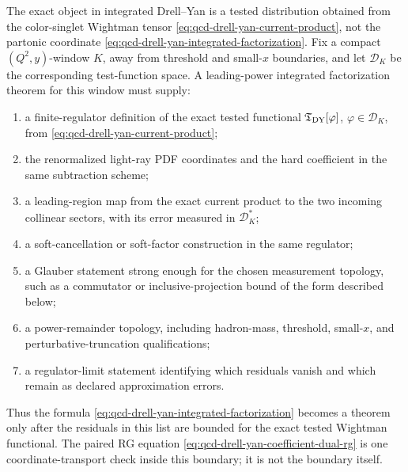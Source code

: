 \begin{remark}
\label{ca:qcd-drell-yan-integrated-theorem-boundary}
The exact object in integrated Drell--Yan is a tested distribution obtained
from the color-singlet Wightman tensor
\eqref{eq:qcd-drell-yan-current-product}, not the partonic coordinate
\eqref{eq:qcd-drell-yan-integrated-factorization}.  Fix a compact
\((Q^2,y)\)-window \(K\), away from threshold and small-\(x\) boundaries, and
let \(\mathcal D_K\) be the corresponding test-function space.  A
leading-power integrated factorization theorem for this window must supply:
\begin{enumerate}
  \item a finite-regulator definition of the exact tested functional
  \(\mathfrak T_{\rm DY}[\varphi]\), \(\varphi\in\mathcal D_K\), from
  \eqref{eq:qcd-drell-yan-current-product};
  \item the renormalized light-ray PDF coordinates and the hard coefficient in
  the same subtraction scheme;
  \item a leading-region map from the exact current product to the two
  incoming collinear sectors, with its error measured in
  \(\mathcal D_K^\ast\);
  \item a soft-cancellation or soft-factor construction in the same regulator;
  \item a Glauber statement strong enough for the chosen measurement topology,
  such as a commutator or inclusive-projection bound of the form described
  below;
  \item a power-remainder topology, including hadron-mass, threshold,
  small-\(x\), and perturbative-truncation qualifications;
  \item a regulator-limit statement identifying which residuals vanish and
  which remain as declared approximation errors.
\end{enumerate}
Thus the formula
\eqref{eq:qcd-drell-yan-integrated-factorization} becomes a theorem only after
the residuals in this list are bounded for the exact tested Wightman functional.
The paired RG equation \eqref{eq:qcd-drell-yan-coefficient-dual-rg} is one
coordinate-transport check inside this boundary; it is not the boundary itself.
\end{remark}

